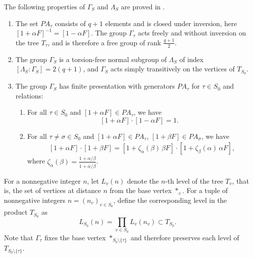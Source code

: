 \documentclass[12pt]{article}
\theoremstyle{definition}
\begin{document}
The following properties of $\Gamma_S$ and $\Lambda_S$ are proved in \cite{RSV2019}.
\begin{enumerate}
  \item The set $PA_\tau$ consists of $q+1$ elements and is closed under inversion, here $[1+\alpha F]^{-1}=[1-\alpha F]$. The group $\Gamma_\tau$ acts freely and without inversion on the tree $T_\tau$, and is therefore a free group of rank $\frac{q+1}{2}$.
  \item The group $\Gamma_S$ is a torsion-free normal subgroup of $\Lambda_S$ of index $[\Lambda_S:\Gamma_S]=2(q+1)$, and $\Gamma_S$ acts simply transitively on the vertices of $T_{S_0}$.
  \item The group $\Gamma_S$ has finite presentation with generators $PA_\tau$ for $\tau\in S_0$ and relations:
\begin{enumerate}
\item[(i)] For all \(\tau \in S_0\) and \([1 + \alpha F] \in P A_{\tau}\), we have
\[
[1 + \alpha F] \cdot [1 - \alpha F] = 1.
\]
\item[(ii)]
  For all \(\tau \neq \sigma \in S_0\) and \([1 + \alpha F] \in P A_{\tau}\), \([1 + \beta F] \in P A_{\sigma}\), we have
\begin{align}\label{eqn:square_relations_Gamma_S}
&[1 + \alpha F] \cdot [1 + \beta F]
= [1 + \zeta_{\alpha}(\beta)\,\beta F] \cdot [1 + \zeta_{\beta}(\alpha)\,\alpha F],
\end{align}
where $\zeta_{\alpha}(\beta) = \frac{1 + \alpha/\beta}{1 + \overline{\alpha}/\overline{\beta}}$.
\end{enumerate}
\end{enumerate}

For a nonnegative integer $n$, let $L_v(n)$ denote the $n$-th level of the tree $T_v$, that is, the set of vertices at distance $n$ from the base vertex $*_v$. For a tuple of nonnegative integers $n=(n_v)_{v \in S_0}$, define the corresponding level in the product $T_{S_0}$ as
\[
L_{S_0}(n) = \prod_{v \in S_0} L_v(n_v)\subset T_{S_0}.
\]
Note that $\Gamma_\tau$ fixes the base vertex $*_{S_0\setminus\{\tau\}}$ and therefore preserves each level of $T_{S_0\setminus \{\tau\} }$.
\end{document}
